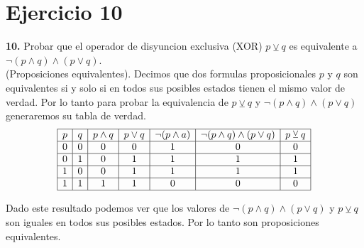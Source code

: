 \chapter*{Ejercicio 10}

\textbf{10.} Probar que el operador de disyuncion exclusiva (XOR) $p \veebar q$ es equivalente a $\neg (p \land q) \land (p \lor q)$.\\
\newline
(Proposiciones equivalentes). Decimos que dos formulas proposicionales $p$ y $q$ son equivalentes si y solo si en todos sus posibles estados tienen el mismo valor de verdad.
Por lo tanto para probar la equivalencia de $p \veebar q$ y $\neg (p \land q) \land (p \lor q)$ generaremos su tabla de verdad. \\
\newline
\[
\begin{array}{|c|c|c|c|c|c|c|}
\hline
p & q & p \land q & p \lor q & \neg (p \land a) & \neg (p \land q) \land (p \lor q) & p \veebar q \\
\hline
0 & 0 & 0 & 0 & 1 & 0 & 0 \\
\hline
0 & 1 & 0 & 1 & 1 & 1 & 1 \\
\hline
1 & 0 & 0 & 1 & 1 & 1 & 1 \\
\hline
1 & 1 & 1 & 1 & 0 & 0 & 0 \\
\hline
\end{array}
\]

Dado este resultado podemos ver que los valores de $\neg (p \land q) \land (p \lor q)$ y $p \veebar q$ son iguales en todos sus posibles estados. Por lo tanto son proposiciones equivalentes.
